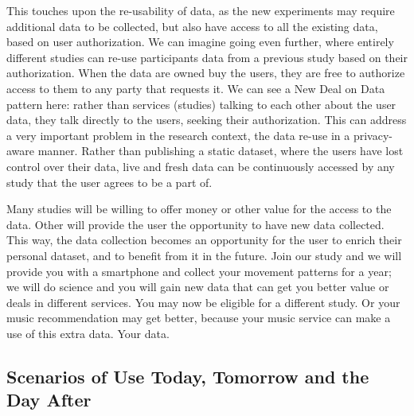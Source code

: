 This touches upon the re-usability of data, as the new experiments may require additional data to be collected, but also have access to all the existing data, based on user authorization. We can imagine going even further, where entirely different studies can re-use participants data from a previous study based on their authorization. When the data are owned buy the users, they are free to authorize access to them to any party that requests it. We can see a New Deal on Data pattern here: rather than services (studies) talking to each other about the user data, they talk directly to the users, seeking their authorization. This can address a very important problem in the research context, the data re-use in a privacy-aware manner. Rather than publishing a static dataset, where the users have lost control over their data, live and fresh data can be continuously accessed by any study that the user agrees to be a part of.

Many studies will be willing to offer money or other value for the access to the data. Other will provide the user the opportunity to have new data collected. This way, the data collection becomes an opportunity for the user to enrich their personal dataset, and to benefit from it in the future. Join our study and we will provide you with a smartphone and collect your movement patterns for a year; we will do science and you will gain new data that can get you better value or deals in different services. You may now be eligible for a different study. Or your music recommendation may get better, because your music service can make a use of this extra data. Your data.

\subsection{Scenarios of Use Today, Tomorrow and the Day After}

